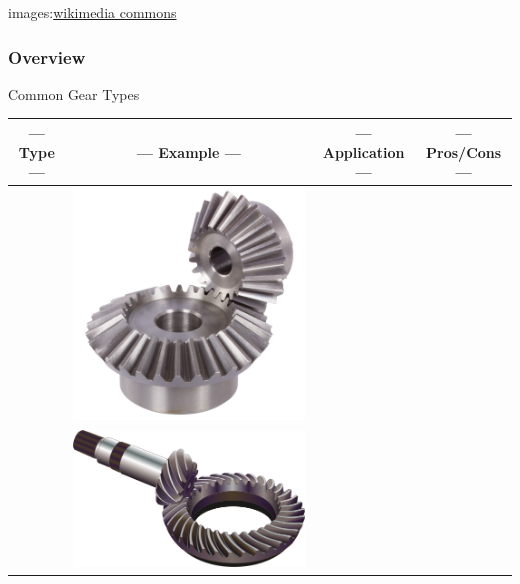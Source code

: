 \documentclass[fleqn]{beamer} %
\newcommand{\sectiontitleI}{Overview} %
\begin{document}
\begin{frame}[label=sectionI]
		{\tiny images:\href{https://commons.wikimedia.org/w/index.php?search=gear&title=Special:MediaSearch&go=Go&type=image}{wikimedia commons} }

	\end{frame}

	\begin{frame}[label=sectionI] \small
		\frametitle{\sectiontitleI}	
		
		Common Gear Types

		\begin{tabular}{|c|c|c|c|} 
			--- Type --- & --- Example --- & --- Application --- & --- Pros/Cons --- \\ \hline
			& \includegraphics[scale=.14]{images/bevel_gear2.png} & & \\ \hline 
			& \includegraphics[scale=.09]{images/helical_bevel.png} & & \\ \hline

\end{tabular}
\end{frame}
\end{document}
